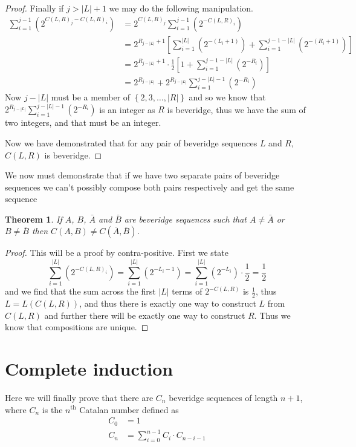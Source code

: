 \documentclass{macjourn}
\def\useLim{}
\newcommand{\sumfrom}[3]{\sum\useLim_{#1}^{#2} \left( {#3} \right)}
\newcommand{\set}[1]{\left\{ {#1} \right\}}
\newcommand{\cardinality}[1]{\left| #1 \right|}
\newtheorem{theorem}{Theorem}[subsection]
\theoremstyle{definition}
\begin{document}
\begin{proof}
		Finally if $j > \cardinality L + 1$ we may do the following manipulation.
		\begin{align*}
			\sumfrom{i=1}{j-1}{2^{C(L,R)_j-C(L,R)_i}}
			&= 2^{C(L,R)_j}\sumfrom{i=1}{j-1}{2^{-C(L,R)_i}} \\
			&= 2^{R_{j-\cardinality L}+1}\left[ \sumfrom{i=1}{\cardinality L}{2^{-(L_i + 1)}} + \sumfrom{i=1}{j-1-\cardinality{L}}{2^{-(R_i + 1)}} \right] \\
			&= 2^{R_{j-\cardinality L} + 1}\cdot\frac12\left[1 +  \sumfrom{i=1}{j-1-\cardinality{L}}{2^{-R_i}}\right] \\
			&= 2^{R_{j-\cardinality L}} + 2^{R_{j-\cardinality L}}\sumfrom{i=1}{j-\cardinality{L}-1}{2^{-R_i}}
		\end{align*}
		Now $j-\cardinality L$ must be a member of $\set{2,3,\ldots,\cardinality R}$ and so we know that $2^{R_{j-\cardinality L}}\sumfrom{i=1}{j-\cardinality{L}-1}{2^{-R_i}}$ is an integer as $R$ is beveridge, thus we have the sum of two integers, and that must be an integer.
		
		Now we have demonstrated that for any pair of beveridge sequences $L$ and $R$, $C(L,R)$ is beveridge.
	\end{proof}
	
	We now must demonstrate that if we have two separate pairs of beveridge sequences we can't possibly compose both pairs respectively and get the same sequence
	
	\begin{theorem} \label{unique}
		If $A$, $B$, $\bar A$ and $\bar B$ are beveridge sequences such that $A \not= \bar A$ or $B \not= \bar B$  then $C(A,B) \not= C(\bar A, \bar B)$.
	\end{theorem}
	\begin{proof}
		This will be a proof by contra-positive. First we state
		\[\sumfrom{i=1}{\cardinality L}{2^{-C(L,R)_i}} = \sumfrom{i=1}{\cardinality L}{2^{-L_i - 1}} = \sumfrom{i=1}{\cardinality L}{2^{-L_i}}\cdot \frac 12 = \frac12\]
		and we find that the sum across the first $\cardinality L$ terms of $2^{-C(L,R)}$ is $\frac12$, thus $L = L(C(L,R))$, and thus there is exactly one way to construct $L$ from $C(L,R)$ and further there will be exactly one way to construct $R$. Thus we know that compositions are unique.
	\end{proof}
	
	\section{Complete induction}
	Here we will finally prove that there are $C_n$ beveridge sequences of length $n+1$, where $C_n$ is the $n^\text{th}$ Catalan number defined as \begin{align*}C_0& = 1 \\ C_n& = \sum_{i=0}^{n-1}C_i\cdot C_{n-i-1}\end{align*}
	
\end{document}
